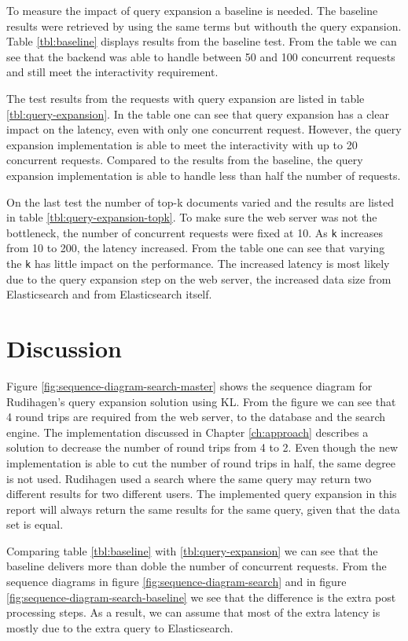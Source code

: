 To measure the impact of query expansion a baseline is needed.
The baseline results were retrieved by using the same terms but withouth the query expansion.
Table \ref{tbl:baseline} displays results from the baseline test.
From the table we can see that the backend was able to handle between 50 and 100 concurrent requests and still meet the interactivity requirement.

The test results from the requests with query expansion are listed in table \ref{tbl:query-expansion}.
In the table one can see that query expansion has a clear impact on the latency, even with only one concurrent request.
However, the query expansion implementation is able to meet the interactivity with up to 20 concurrent requests.
Compared to the results from the baseline,
the query expansion implementation is able to handle less than half the number of requests.

On the last test the number of top-k documents varied and the results are listed in table \ref{tbl:query-expansion-topk}.
To make sure the web server was not the bottleneck, the number of concurrent requests were fixed at 10.
As \texttt{k} increases from 10 to 200, the latency increased.
From the table one can see that varying the \texttt{k} has little impact on the performance.
The increased latency is most likely due to the query expansion step on the web server,
the increased data size from Elasticsearch and from Elasticsearch itself.



\section{Discussion}
Figure \ref{fig:sequence-diagram-search-master} shows the sequence diagram for Rudihagen's query expansion solution using KL.
From the figure we can see that 4 round trips are required from the web server, to the database and the search engine.
The implementation discussed in Chapter \ref{ch:approach} describes a solution to decrease the number of round trips from 4 to 2.
Even though the new implementation is able to cut the number of round trips in half, the same degree is not used.
Rudihagen used a search where the same query may return two different results for two different users.
The implemented query expansion in this report will always return the same results for the same query, given that the data set is equal.

Comparing table \ref{tbl:baseline} with \ref{tbl:query-expansion} we can see that the baseline delivers more than doble the number of concurrent requests.
From the sequence diagrams in figure \ref{fig:sequence-diagram-search} and in figure \ref{fig:sequence-diagram-search-baseline} we see that the difference is the extra post processing steps.
As a result, we can assume that most of the extra latency is mostly due to the extra query to Elasticsearch.

